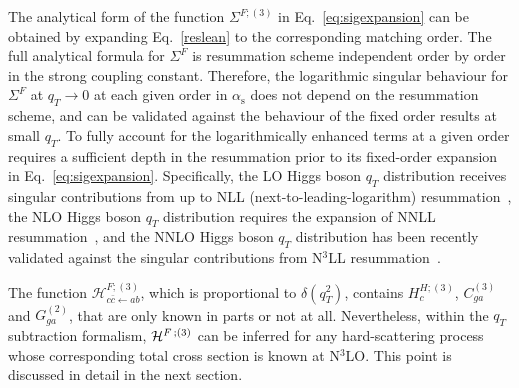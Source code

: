 \documentclass[12pt]{article}
\DeclareRobustCommand{\as}{\ensuremath{\alpha_{\mathrm{s}}}}
\DeclareRobustCommand{\qt}{q_T}
\begin{document}
The analytical form of the function $\Sigma^{F;(3)}$ in Eq.~\eqref{eq:sigexpansion} can be obtained by expanding Eq.~\eqref{reslean} to the corresponding matching order. The full analytical formula for $\Sigma^{F}$ is resummation scheme independent order by order in the strong coupling constant. Therefore, the logarithmic singular behaviour for $\Sigma^{F}$ at $\qt\rightarrow 0$ at 
each given order in $\as$ does not depend on the 
resummation scheme, and can be validated against the behaviour of the fixed order results at small $\qt$. To fully 
account for the logarithmically enhanced terms at a given order requires a sufficient depth in the resummation prior to 
its fixed-order expansion in Eq.~\eqref{eq:sigexpansion}. Specifically, the LO Higgs boson $\qt$ distribution receives singular contributions from up to NLL (next-to-leading-logarithm) resummation~\cite{Catani:1988vd,Kauffman:1991cx}, the NLO Higgs boson $\qt$ distribution requires the expansion of NNLL resummation~\cite{deFlorian:2001zd,deFlorian:2000pr,Becher:2012yn,Neill:2015roa}, and the NNLO Higgs boson $\qt$ distribution has been recently validated against the singular contributions from N$^3$LL resummation~\cite{Chen:2018pzu,Bizon:2018foh}. 

The function $\mathcal{H}^{F;(3)}_{c\bar{c}\leftarrow ab}$, which is proportional to $\delta(q^{2}_{T})$, contains $H^{H;(3)}_{c}$, $C^{(3)}_{ga}$ and $G^{(2)}_{ga}$,  that are only known in parts or not at all. Nevertheless, within the $\qt$ subtraction  formalism, ${\cal H}^{F \,;(3)}$ can be inferred for any hard-scattering process whose corresponding total cross section is known at N$^{3}$LO. This point is discussed in detail in the next section.


\setcounter{footnote}{0}
\end{document}
